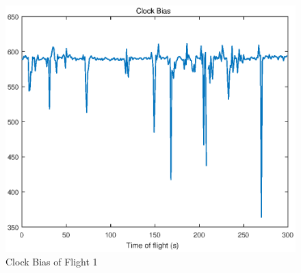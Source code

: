 \documentclass[Space3_Assign2]{subfile}
\begin{document}
\begin{figure}
\centering
\includegraphics[width=0.8\linewidth]{clockbias}
\caption{Clock Bias of Flight 1}
\label{fig:clockbias}
\end{figure}
\end{document}
